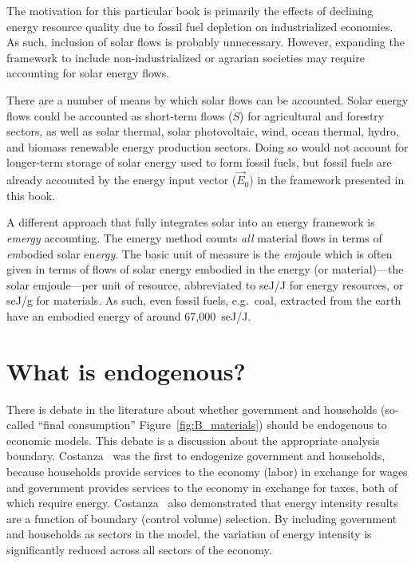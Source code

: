 The motivation for this particular book is primarily 
the effects of declining energy resource quality
due to fossil fuel depletion on industrialized economies. 
As such, inclusion of solar flows is probably unnecessary. 
However, expanding the framework to include non-industrialized 
or agrarian societies may require accounting for solar energy flows. 

There are a number of means by which solar flows can be accounted. 
Solar energy flows could be accounted as short-term flows ($\dot{S}$)
for agricultural and forestry sectors, 
as well as 
solar thermal, 
solar photovoltaic, 
wind, 
ocean thermal, 
hydro, and
biomass
renewable energy
production sectors.
Doing so would not account for longer-term storage
of solar energy used to form fossil fuels, 
but fossil fuels are already accounted by the energy input vector ($\vec{E}_{0}$)
in the framework presented in this book.

A different approach that fully integrates solar 
into an energy framework is \emph{emergy} accounting.
The emergy method counts \emph{all} material flows 
in terms of \emph{em}bodied solar en\emph{ergy}.\cite{Odum1975, Odum1996}
The basic unit of measure is 
the \emph{em}joule which is often given in terms 
of flows of solar energy embodied in 
the energy (or material)---the solar emjoule---per unit of resource, 
abbreviated to seJ/J for energy resources, 
or seJ/g for materials. 
As such, even fossil fuels, e.g.\ coal, 
extracted from the earth have an embodied energy 
of around 67,000~seJ/J.\cite{Brown2004} 


\section{What is endogenous?}
\label{sec:what_is_endogenous}

There is debate in the literature about whether government 
and households 
(so-called ``final consumption'' Figure~\ref{fig:B_materials}) 
should be endogenous to economic models.
This debate is a discussion about the appropriate analysis boundary.
Costanza~\cite{Costanza:1980ww} was the first to endogenize government and households, 
because households provide services to the economy (labor) in exchange for wages 
and government provides services to the economy in exchange for taxes, 
both of which require energy. 
Costanza~\cite{Costanza:1980ww} also demonstrated that 
energy intensity results
are a function of boundary (control volume) selection. 
By including government and households 
as sectors in the model, 
the variation of energy intensity is significantly reduced 
across all sectors of the economy. 

